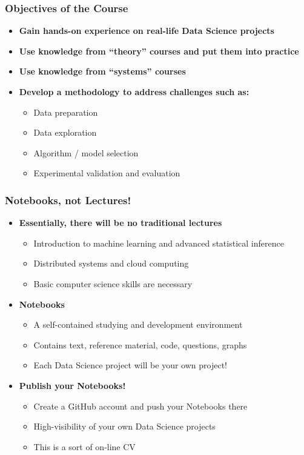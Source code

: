 \begin{frame}\frametitle{Objectives of the Course}
\begin{itemize}
	\item {\bf Gain hands-on experience on real-life Data Science projects}
	\item {\bf Use knowledge from ``theory'' courses and put them into practice}
	\item {\bf Use knowledge from ``systems'' courses} 
	\item {\bf Develop a methodology to address challenges such as:}
	\begin{itemize}
		\item Data preparation
		\item Data exploration
		\item Algorithm / model selection
		\item Experimental validation and evaluation
	\end{itemize}
\end{itemize}
\end{frame}

\begin{frame}\frametitle{Notebooks, not Lectures!}
\begin{itemize}
	\item {\bf Essentially, there will be no traditional lectures}
	\begin{itemize}
		\item Introduction to machine learning and advanced statistical inference
		\item Distributed systems and cloud computing
		\item Basic computer science skills are necessary
	\end{itemize}

	\item {\bf Notebooks}
	\begin{itemize}
		\item A self-contained studying and development environment
		\item Contains text, reference material, code, questions, graphs
		\item Each Data Science project will be your own project!
	\end{itemize}

	\item {\bf Publish your Notebooks!}
	\begin{itemize}
		\item Create a GitHub account and push your Notebooks there
		\item High-visibility of your own Data Science projects
		\item This is a sort of on-line CV
	\end{itemize}
\end{itemize}
\end{frame}

